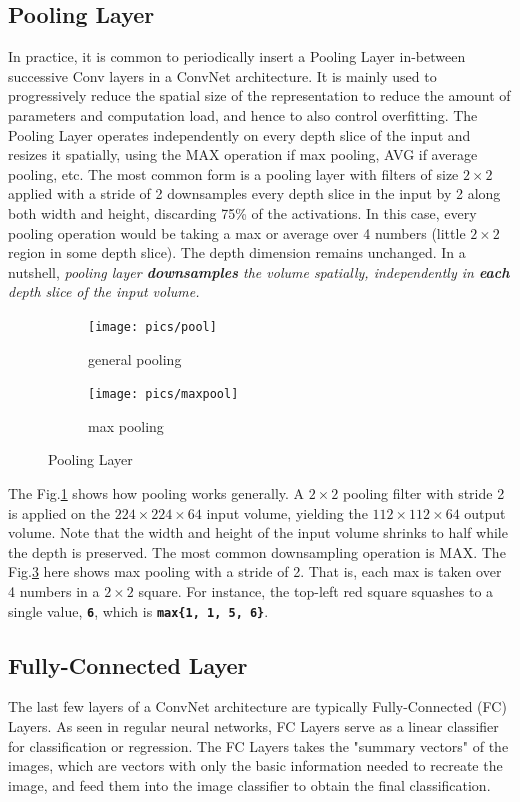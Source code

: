 \documentclass[twoside]{article}
\begin{document}
\subsection{Pooling Layer}
In practice, it is common to periodically insert a Pooling Layer in-between successive Conv layers in a ConvNet architecture. It is mainly used to progressively reduce the spatial size of the representation to reduce the amount of parameters and computation load, and hence to also control overfitting. The Pooling Layer operates independently on every depth slice of the input and resizes it spatially, using the MAX operation if max pooling, AVG if average pooling, etc. The most common form is a pooling layer with filters of size $2\times2$ applied with a stride of 2 downsamples every depth slice in the input by 2 along both width and height, discarding 75\% of the activations. In this case, every pooling operation would be taking a max or average over 4 numbers (little $2\times2$ region in some depth slice). The depth dimension remains unchanged. In a nutshell, \textit{pooling layer \textbf{downsamples} the volume spatially, independently in \textbf{each} depth slice of the input volume.}

\begin{figure}[!htb]
\begin{subfigure}[!htb]{0.45\linewidth}
\texttt{[image: pics/pool]}
\caption{general pooling}
\label{fig:genpool}
\end{subfigure}
\hfill
\begin{subfigure}[!htb]{0.54\linewidth}
\texttt{[image: pics/maxpool]}
\caption{max pooling}
\label{fig:maxpool}
\end{subfigure}
\caption{Pooling Layer\cite{cs231n-website}}
\end{figure}

The Fig.\ref{fig:genpool} shows how pooling works generally. A $2\times2$ pooling filter with stride 2 is applied on the $224\times224\times64$ input volume, yielding the $112\times112\times64$ output volume. Note that the width and height of the input volume shrinks to half while the depth is preserved. The most common downsampling operation is MAX. The Fig.\ref{fig:maxpool} here shows max pooling with a stride of 2. That is, each max is taken over 4 numbers in a $2\times2$ square. For instance, the top-left red square squashes to a single value, \texttt{\textbf{6}}, which is \texttt{\textbf{max\{1, 1, 5, 6\}}}.

\subsection{Fully-Connected Layer}
The last few layers of a ConvNet architecture are typically Fully-Connected (FC) Layers. As seen in regular neural networks, FC Layers serve as a linear classifier for classification or regression. The FC Layers takes the "summary vectors" of the images, which are vectors with only the basic information needed to recreate the image, and feed them into the image classifier to obtain the final classification.
\end{document}
